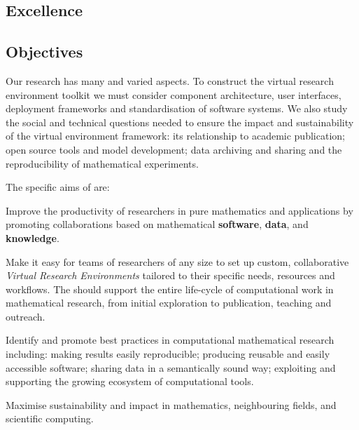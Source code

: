 \documentclass[noworkareas,deliverables,\classoptions]{euproposal}       %
\begin{document}
\begin{proposal}
\section{Excellence}



\subsection{Objectives}
\label{sect:objectives}


Our research has many and varied aspects. To
construct the \TheProject virtual research environment toolkit we must
consider component architecture, user interfaces, deployment
frameworks and standardisation of software systems.  We also study
the social and technical questions needed to ensure the impact and sustainability of the
virtual environment framework: its relationship to academic publication; open source
tools and model development; data archiving and sharing and the reproducibility of
mathematical experiments.

The specific aims of \TheProject are:
\begin{compactenum}
\item \label{aim:collaboration} Improve the productivity of
  researchers in pure mathematics and applications by promoting
  collaborations based on mathematical \textbf{software},
  \textbf{data}, and \textbf{knowledge}.
\item \label{aim:vre} Make it easy for teams of researchers of any
  size to set up custom, collaborative \emph{Virtual Research
    Environments} tailored to their specific needs, resources and
  workflows. The \VREs should support the entire life-cycle of
  computational work in mathematical research, from initial
  exploration to publication, teaching and outreach.
\item \label{aim:sharing} Identify and promote best practices in
  computational mathematical research including: making results easily
  reproducible; producing reusable and easily accessible
  software; sharing data in a semantically sound way; exploiting and
  supporting the growing ecosystem of computational tools.
\item \label{aim:impact} Maximise sustainability and impact in
  mathematics, neighbouring fields, and scientific computing.
\end{compactenum}


\end{proposal}
\end{document}
